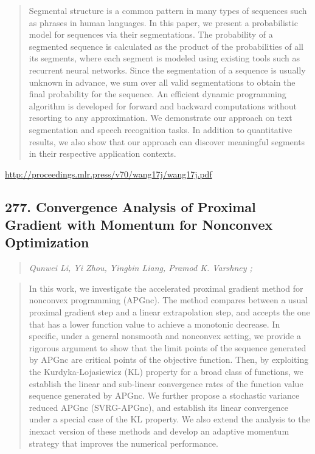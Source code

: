 \documentclass{article}
\begin{document}
\begin{quote}
    Segmental structure is a common pattern in many types of sequences such as phrases in human languages. In this paper, we present a probabilistic model for sequences via their segmentations. The probability of a segmented sequence is calculated as the product of the probabilities of all its segments, where each segment is modeled using existing tools such as recurrent neural networks. Since the segmentation of a sequence is usually unknown in advance, we sum over all valid segmentations to obtain the final probability for the sequence. An efficient dynamic programming algorithm is developed for forward and backward computations without resorting to any approximation. We demonstrate our approach on text segmentation and speech recognition tasks. In addition to quantitative results, we also show that our approach can discover meaningful segments in their respective application contexts.  
\end{quote}

\href{http://proceedings.mlr.press/v70/wang17j/wang17j.pdf}{http://proceedings.mlr.press/v70/wang17j/wang17j.pdf}

\subsection{277. Convergence Analysis of Proximal Gradient with Momentum for Nonconvex Optimization}

\begin{quote}
\footnotesize{\textit{Qunwei Li, Yi Zhou, Yingbin Liang, Pramod K. Varshney ;}}

\end{quote}

\begin{quote}
    In this work, we investigate the accelerated proximal gradient method for nonconvex programming (APGnc). The method compares between a usual proximal gradient step and a linear extrapolation step, and accepts the one that has a lower function value to achieve a monotonic decrease. In specific, under a general nonsmooth and nonconvex setting, we provide a rigorous argument to show that the limit points of the sequence generated by APGnc are critical points of the objective function. Then, by exploiting the Kurdyka-Lojasiewicz (KL) property for a broad class of functions, we establish the linear and sub-linear convergence rates of the function value sequence generated by APGnc. We further propose a stochastic variance reduced APGnc (SVRG-APGnc), and establish its linear convergence under a special case of the KL property. We also extend the analysis to the inexact version of these methods and develop an adaptive momentum strategy that improves the numerical performance.  
\end{quote}
\end{document}
